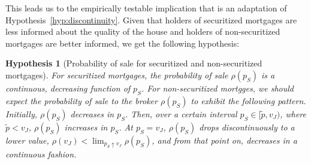 \documentclass[11pt,twopage]{article}
\newtheorem{conjecture}{Hypothesis}
{\bf}{\it}
\begin{document}
%

This leads us to the empirically testable implication that is an adaptation of Hypothesis~\ref{hyp:discontinuity}. Given that holders of securitized mortgages are less informed about the quality of the house and holders of non-securitized mortgages are better informed, we get the following hypothesis:

\begin{conjecture}[Probability of sale for securitized and non-securitized mortgages]\label{hyp:discontinuity-sec-nonsec}
	For securitized mortgages, the probability of sale $\rho(p_S)$ is a continuous, decreasing function of $p_S$. For non-securitized mortgges, we should expect the probability of sale to the broker $\rho(p_S)$ to exhibit the following pattern. Initially, $\rho(p_S)$ decreases in $p_S$. Then, over a certain interval $p_S \in [\tilde p, v_J)$, where $\tilde p < v_J$, $\rho(p_S)$ increases in $p_S$. At $p_S = v_J$, $\rho(p_S)$ drops discontinuously to a lower value, $\rho(v_J)<\lim_{p_S \uparrow v_J} \rho(p_S)$, and from that point on, decreases in a continuous fashion.
\end{conjecture}
\end{document}
